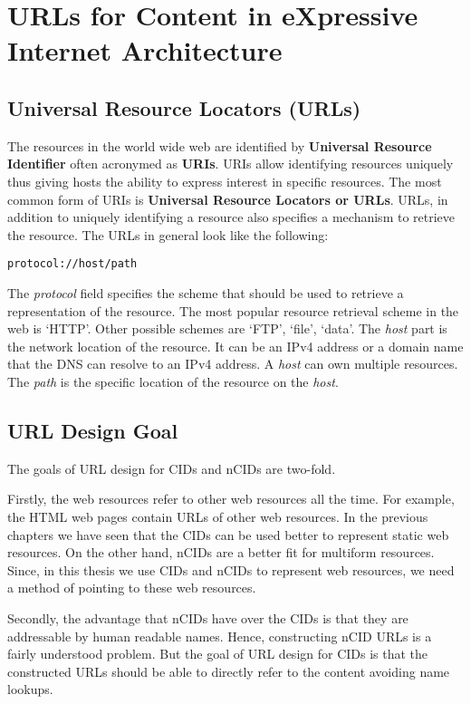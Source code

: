 \chapter{URLs for Content in eXpressive Internet Architecture}
\label{sec:urls}

\section{Universal Resource Locators (URLs)}
The resources in the world wide web are identified by
\textbf{Universal Resource Identifier} often acronymed as
\textbf{URIs}. URIs allow identifying resources uniquely thus giving
hosts the ability to express interest in specific resources. The most
common form of URIs is \textbf{Universal Resource Locators or
  URLs}. URLs, in addition to uniquely identifying a resource also
specifies a mechanism to retrieve the resource. The URLs in general
look like the following:

\begin{center}
  \texttt{protocol://host/path}
\end{center}

The \textit{protocol} field specifies the scheme that should be used
to retrieve a representation of the resource. The most popular
resource retrieval scheme in the web is `HTTP'. Other possible schemes
are `FTP', `file', `data'. The \textit{host} part is the network
location of the resource. It can be an IPv4 address or a domain name
that the DNS can resolve to an IPv4 address. A \textit{host} can own
multiple resources. The \textit{path} is the specific location of the
resource on the \textit{host}.

\section{URL Design Goal}
The goals of URL design for CIDs and nCIDs are two-fold.

Firstly, the web resources refer to other web resources all the
time. For example, the HTML web pages contain URLs of other web
resources. In the previous chapters we have seen that the CIDs can be
used better to represent static web resources. On the other hand,
nCIDs are a better fit for multiform resources. Since, in this thesis
we use CIDs and nCIDs to represent web resources, we need a method of
pointing to these web resources.

Secondly, the advantage that nCIDs have over the CIDs is that they are
addressable by human readable names. Hence, constructing nCID URLs is
a fairly understood problem. But the goal of URL design for CIDs is
that the constructed URLs should be able to directly refer to the
content avoiding name lookups.


